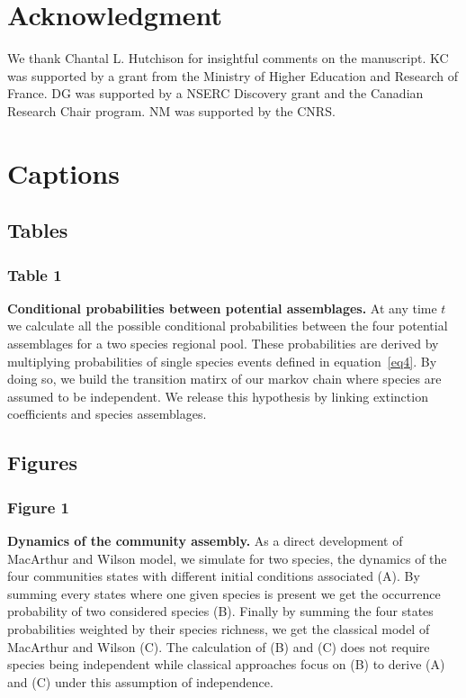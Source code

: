 \section{Acknowledgment}
We thank Chantal L. Hutchison for insightful comments on the manuscript.
KC was supported by a grant from the Ministry of Higher Education and Research of France. DG was supported by a NSERC Discovery grant and the Canadian Research Chair program. NM was supported by the CNRS.


%
% 
% 



\section*{Captions}

\subsection*{Tables}

\subsubsection*{Table 1}
\textbf{Conditional probabilities between potential assemblages.} At any time $t$ we calculate all the possible conditional probabilities between the four potential assemblages for a two species regional pool. These probabilities are derived by multiplying probabilities of single species events defined in equation~\eqref{eq4}. By doing so, we build the transition matirx of our markov chain where species are assumed to be independent. We release this hypothesis by linking extinction coefficients and species assemblages.

\newpage

\subsection*{Figures}

\subsubsection*{Figure 1}

\textbf{Dynamics of the community assembly.} As a direct development of MacArthur and Wilson model, we simulate for two species, the dynamics of the four communities states with different initial conditions associated (A). By summing every states where one given species is present we get the occurrence probability of two considered species (B). Finally by summing the four states probabilities weighted by their species richness, we get the classical model of MacArthur and Wilson (C). The calculation of (B) and (C) does not require species being independent while classical approaches focus on (B) to derive (A) and (C) under this assumption of independence.

